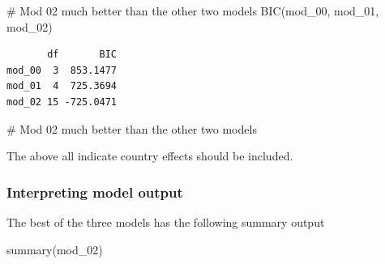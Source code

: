 \documentclass[
  letterpaper,
  DIV=11,
  numbers=noendperiod]{scrartcl}
\newenvironment{Shaded}{\begin{snugshade}}{\end{snugshade}}
\newcommand{\CommentTok}[1]{\textcolor[rgb]{0.37,0.37,0.37}{#1}}
\newcommand{\FunctionTok}[1]{\textcolor[rgb]{0.28,0.35,0.67}{#1}}
\newcommand{\NormalTok}[1]{\textcolor[rgb]{0.00,0.23,0.31}{#1}}
\begin{document}
\begin{Shaded}
\begin{Highlighting}[]
\CommentTok{\# Mod 02 much better than the other two models}
\FunctionTok{BIC}\NormalTok{(mod\_00, mod\_01, mod\_02)}
\end{Highlighting}
\end{Shaded}

\begin{verbatim}
       df       BIC
mod_00  3  853.1477
mod_01  4  725.3694
mod_02 15 -725.0471
\end{verbatim}

\begin{Shaded}
\begin{Highlighting}[]
\CommentTok{\# Mod 02 much better than the other two models}
\end{Highlighting}
\end{Shaded}

The above all indicate country effects should be included.

\hypertarget{interpreting-model-output}{%
\subsubsection{Interpreting model
output}\label{interpreting-model-output}}

The best of the three models has the following summary output

\begin{Shaded}
\begin{Highlighting}[]
\FunctionTok{summary}\NormalTok{(mod\_02)}
\end{Highlighting}
\end{Shaded}
\end{document}
